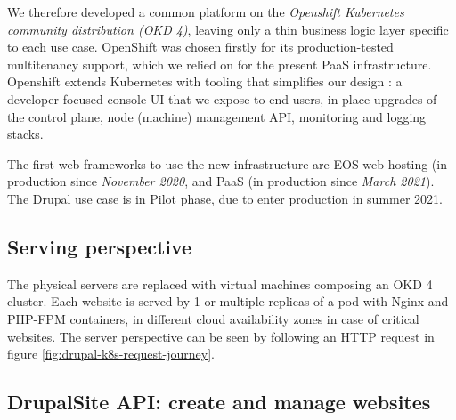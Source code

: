We therefore developed a common platform on the \emph{Openshift Kubernetes community distribution (OKD 4)},
leaving only a thin business logic layer specific to each use case.
OpenShift was chosen firstly for its production-tested multitenancy support, which we relied on for the present PaaS infrastructure.
Openshift extends Kubernetes with tooling that simplifies our design \cite{jarvinenExtendingKubernetesOperator2019}:
a developer-focused console UI that we expose to end users, in-place upgrades of the control plane, node (machine) management API, monitoring and logging stacks.

The first web frameworks to use the new infrastructure are EOS web hosting (in production since \emph{November 2020},
and PaaS (in production since \emph{March 2021}).
The Drupal use case is in Pilot phase, due to enter production in summer 2021.

\subsection{Serving perspective}

The physical servers are replaced with virtual machines composing an OKD 4 cluster.
Each website is served by 1 or multiple replicas of a pod with Nginx and PHP-FPM containers,
in different cloud availability zones in case of critical websites.
The server perspective can be seen by following an HTTP request in figure \ref{fig:drupal-k8s-request-journey}.

\subsection{DrupalSite API: create and manage websites}

